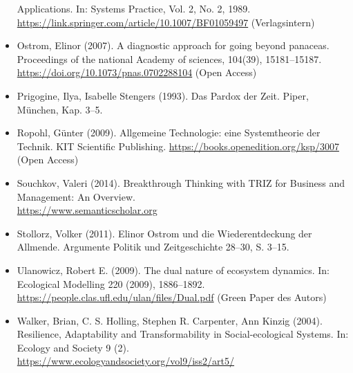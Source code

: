 \documentclass[11pt,a4paper]{article}
\begin{document}
\begin{itemize}
  Applications. In: Systems Practice, Vol. 2, No. 2, 1989.\\
  \url{https://link.springer.com/article/10.1007/BF01059497} (Verlagsintern) 
\item Ostrom, Elinor (2007). A diagnostic approach for going beyond panaceas.
  Proceedings of the national Academy of sciences, 104(39), 15181--15187.\\
  \url{https://doi.org/10.1073/pnas.0702288104} (Open Access)
\item Prigogine, Ilya, Isabelle Stengers (1993). Das Pardox der Zeit. Piper,
  München, Kap. 3--5.  
\item Ropohl, Günter (2009). Allgemeine Technologie: eine Systemtheorie der
  Technik.  KIT Scientific Publishing.
  \url{https://books.openedition.org/ksp/3007} (Open Access) 
\item Souchkov, Valeri (2014). Breakthrough Thinking with TRIZ for Business
  and Management: An Overview.\\ \url{https://www.semanticscholar.org}
\item Stollorz, Volker (2011). Elinor Ostrom und die Wiederentdeckung der
  Allmende. Argumente Politik und Zeitgeschichte 28--30, S. 3--15. 
\item Ulanowicz, Robert E. (2009). The dual nature of ecosystem dynamics.
  In: Ecological Modelling 220 (2009), 1886–1892.\\
  \url{https://people.clas.ufl.edu/ulan/files/Dual.pdf} (Green Paper des
  Autors) 
\item Walker, Brian, C. S. Holling, Stephen R. Carpenter, Ann Kinzig (2004).
  Resilience, Adaptability and Transformability in Social-ecological Systems. 
  In: Ecology and Society 9 (2).
  \url{https://www.ecologyandsociety.org/vol9/iss2/art5/}
\end{itemize}
\end{document}
